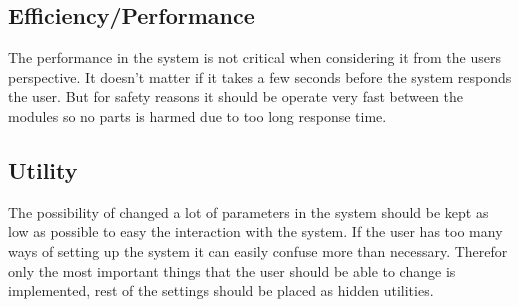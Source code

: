 \subsection{Efficiency/Performance}
The performance in the system is not critical when considering it from the users perspective. It doesn't matter if it takes a few seconds before the system responds the user. But for safety reasons it should be operate very fast between the modules so no parts is harmed due to too long response time.
\subsection{Utility}
The possibility of changed a lot of parameters in the system should be kept as low as possible to easy the interaction with the system. If the user has too many ways of setting up the system it can easily confuse more than necessary. Therefor only the most important things that the user should be able to change is implemented, rest of the settings should be placed as hidden utilities. 
